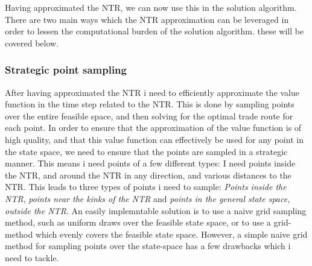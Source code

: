 \documentclass[11pt]{article}
\begin{document}
Having approximated the \ac{NTR}, we can now use this in the solution algorithm. There are two main ways which the \ac{NTR} approximation can be leveraged in order to
lessen the computational burden of the solution algorithm. these will be covered below.
\subsubsection{Strategic point sampling} \label{subsubsection: Sample}
After having approximated the \ac{NTR} i need to efficiently approximate the value function in the time step related to the \ac{NTR}. 
This is done by sampling points over the entire feasible space, and then solving for the optimal trade route for each point.
In order to ensure that the approximation of the value function is of high quality, and that this value function can effectively be used for any point in the state space,
we need to ensure that the points are sampled in a strategic manner. This means i need points of a few different types:
I need points inside the NTR, and around the \ac{NTR} in any direction, and various distances to the \ac{NTR}.
This leads to three types of points i need to sample: \textit{Points inside the \ac{NTR}}, \textit{points near the kinks of the \ac{NTR}} and \textit{points in the general state space, outside the \ac{NTR}}.
An easily implemntable solution is to use a naive grid sampling method, such as uniform draws over the feasible state space, or to use a grid-method which evenly covers the feasible state space. 
However, a simple naive grid method for sampling points over the state-space has a few drawbacks which i need to tackle.
\end{document}
